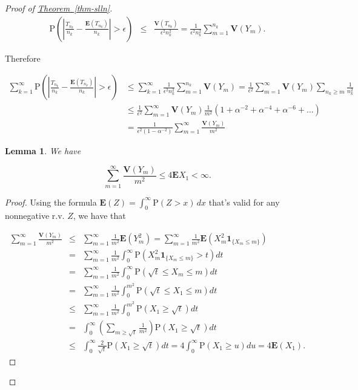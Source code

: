 \documentclass[11pt]{report}
\theoremstyle{plain}
\newtheorem{lem}[thm]{Lemma}
\theoremstyle{definition}
\begin{document}
\begin{proof}[Proof of \texorpdfstring{\hyperref[thm-slln]{Theorem~\ref*{thm-slln}}}{Theorem}]
\begin{eqnarray*}
\mathrm{P}\left(\left|\frac{T_{n_k}}{n_k} - \frac{\mathbf{E}(T_{n_k})}{n_k}\right| > \epsilon\right)
&\le&
\frac{\mathbf{V}(T_{n_k})}{\epsilon^2 n_k^2}
= \frac{1}{\epsilon^2 n_k^2} \sum_{m=1}^{n_k} \mathbf{V}(Y_m).
\end{eqnarray*}

\noindent Therefore

\begin{align*}
\sum_{k=1}^\infty
\mathrm{P}\left(\left|\frac{T_{n_k}}{n_k} - \frac{\mathbf{E}(T_{n_k})}{n_k}\right| > \epsilon\right)
&\le
\sum_{k=1}^\infty  \frac{1}{\epsilon^2 n_k^2} \sum_{m=1}^{n_k} \mathbf{V}(Y_m)
= \frac{1}{\epsilon^2} \sum_{m=1}^\infty \mathbf{V}(Y_m) \sum_{n_k\ge m} \frac{1}{n_k^2}
\\
&\le
\frac{1}{\epsilon^2} \sum_{m=1}^\infty \mathbf{V}(Y_m) \frac{1}{m^2}(1+\alpha^{-2}+\alpha^{-4}+\alpha^{-6}+\ldots)
\\
&=
\tag{9}\label{eq:infinitesum}
\frac{1}{\epsilon^2(1-\alpha^{-2})} \sum_{m=1}^\infty  \frac{\mathbf{V}(Y_m)}{m^2}
\end{align*}

\begin{lem}
We have

\[
\sum_{m=1}^\infty \frac{\mathbf{V}(Y_m)}{m^2} \le 4 \mathbf{E} X_1 < \infty.
\]

\end{lem}

\begin{proof}
Using the formula
$\mathbf{E}(Z)=\int_0^\infty \mathrm{P}(Z>x)\,dx$
that's valid for any nonnegative r.v. $Z$, we have
that

\begin{eqnarray*}
\sum_{m=1}^\infty \frac{\mathbf{V}(Y_m)}{m^2} &\le& \sum_{m=1}^\infty \frac{1}{m^2} \mathbf{E}(Y_m^2)
=\sum_{m=1}^\infty \frac{1}{m^2}\mathbf{E}\left(X_m^2 \mathbf{1}_{\{X_m\le m\}}\right) \\
&=& \sum_{m=1}^\infty \frac{1}{m^2} \int_0^\infty \mathrm{P}\left(X_m^2 \mathbf{1}_{\{X_m\le m\}}>t\right)dt \\
&=& \sum_{m=1}^\infty \frac{1}{m^2} \int_0^\infty \mathrm{P}\left(\sqrt{t} \le X_m \le m \right)dt \\
&=& \sum_{m=1}^\infty \frac{1}{m^2} \int_0^{m^2} \mathrm{P}\left(\sqrt{t} \le X_1 \le m \right)dt \\
&\le& \sum_{m=1}^\infty \frac{1}{m^2} \int_0^{m^2} \mathrm{P}\left(X_1 \ge \sqrt{t} \right)dt \\
&=& \int_0^\infty \left(\sum_{m\ge \sqrt{t}} \frac{1}{m^2}\right) \mathrm{P}\left(X_1\ge \sqrt{t}\right)dt \\
&\le& \int_0^\infty \frac{2}{\sqrt{t}} \mathrm{P}\left(X_1\ge \sqrt{t}\right)dt = 4 \int_0^\infty \mathrm{P}(X_1\ge u)du = 4\mathbf{E}(X_1).
\end{eqnarray*}


\end{proof}
\end{proof}
\end{document}
